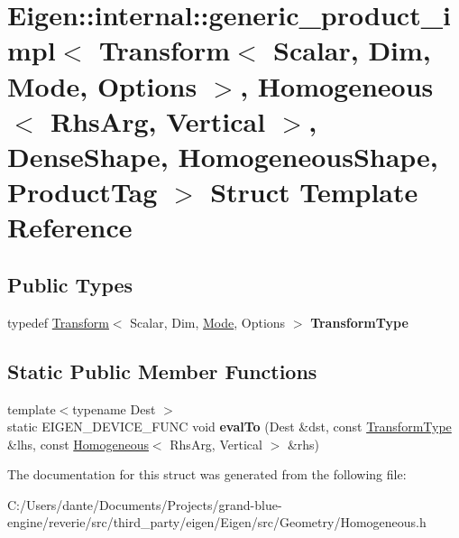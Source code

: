 \hypertarget{struct_eigen_1_1internal_1_1generic__product__impl_3_01_transform_3_01_scalar_00_01_dim_00_01_mo9dee7991850e2cedf8646fca36129af2}{}\section{Eigen\+::internal\+::generic\+\_\+product\+\_\+impl$<$ Transform$<$ Scalar, Dim, Mode, Options $>$, Homogeneous$<$ Rhs\+Arg, Vertical $>$, Dense\+Shape, Homogeneous\+Shape, Product\+Tag $>$ Struct Template Reference}
\label{struct_eigen_1_1internal_1_1generic__product__impl_3_01_transform_3_01_scalar_00_01_dim_00_01_mo9dee7991850e2cedf8646fca36129af2}
\subsection*{Public Types}
\begin{DoxyCompactItemize}
\item 
\mbox{\label{struct_eigen_1_1internal_1_1generic__product__impl_3_01_transform_3_01_scalar_00_01_dim_00_01_mo9dee7991850e2cedf8646fca36129af2_afd08afc85d6796cb4200d5947afb5fd8}} 
typedef \mbox{\hyperlink{class_eigen_1_1_transform}{Transform}}$<$ Scalar, Dim, \mbox{\hyperlink{struct_mode}{Mode}}, Options $>$ {\bfseries Transform\+Type}
\end{DoxyCompactItemize}
\subsection*{Static Public Member Functions}
\begin{DoxyCompactItemize}
\item 
\mbox{\label{struct_eigen_1_1internal_1_1generic__product__impl_3_01_transform_3_01_scalar_00_01_dim_00_01_mo9dee7991850e2cedf8646fca36129af2_ac033f7d219536619cb43eb53bbae04a4}} 
{\footnotesize template$<$typename Dest $>$ }\\static E\+I\+G\+E\+N\+\_\+\+D\+E\+V\+I\+C\+E\+\_\+\+F\+U\+NC void {\bfseries eval\+To} (Dest \&dst, const \mbox{\hyperlink{class_eigen_1_1_transform}{Transform\+Type}} \&lhs, const \mbox{\hyperlink{class_eigen_1_1_homogeneous}{Homogeneous}}$<$ Rhs\+Arg, Vertical $>$ \&rhs)
\end{DoxyCompactItemize}


The documentation for this struct was generated from the following file\+:\begin{DoxyCompactItemize}
\item 
C\+:/\+Users/dante/\+Documents/\+Projects/grand-\/blue-\/engine/reverie/src/third\+\_\+party/eigen/\+Eigen/src/\+Geometry/Homogeneous.\+h\end{DoxyCompactItemize}
